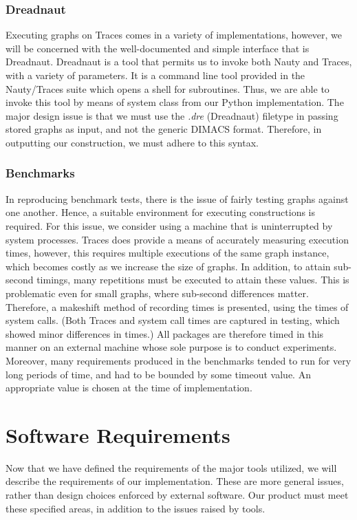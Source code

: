 \subsubsection{Dreadnaut}
Executing graphs on Traces comes in a variety of implementations, however, we will be concerned with the well-documented and simple interface that is Dreadnaut. Dreadnaut is a tool that permits us to invoke both Nauty and Traces, with a variety of parameters. It is a command line tool provided in the Nauty/Traces suite which opens a shell for subroutines. Thus, we are able to invoke this tool by means of system class from our Python implementation. The major design issue is that we must use the \emph{.dre} (Dreadnaut) filetype in passing stored graphs as input, and not the generic DIMACS format. Therefore, in outputting our construction, we must adhere to this syntax.

\subsubsection{Benchmarks}
In reproducing benchmark tests, there is the issue of fairly testing graphs against one another. Hence, a suitable environment for executing constructions is required. For this issue, we consider using a machine that is uninterrupted by system processes. Traces does provide a means of accurately measuring execution times, however, this requires multiple executions of the same graph instance, which becomes costly as we increase the size of graphs. In addition, to attain sub-second timings, many repetitions must be executed to attain these values. This is problematic even for small graphs, where sub-second differences matter. Therefore, a makeshift method of recording times is presented, using the times of system calls. (Both Traces and system call times are captured in testing, which showed minor differences in times.) All packages are therefore timed in this manner on an external machine whose sole purpose is to conduct experiments. Moreover, many requirements produced in the benchmarks tended to run for very long periods of time, and had to be bounded by some timeout value. An appropriate value is chosen at the time of implementation. 

\section{Software Requirements}
Now that we have defined the requirements of the major tools utilized, we will describe the requirements of our implementation. These are more general issues, rather than design choices enforced by external software. Our product must meet these specified areas, in addition to the issues raised by tools. 

